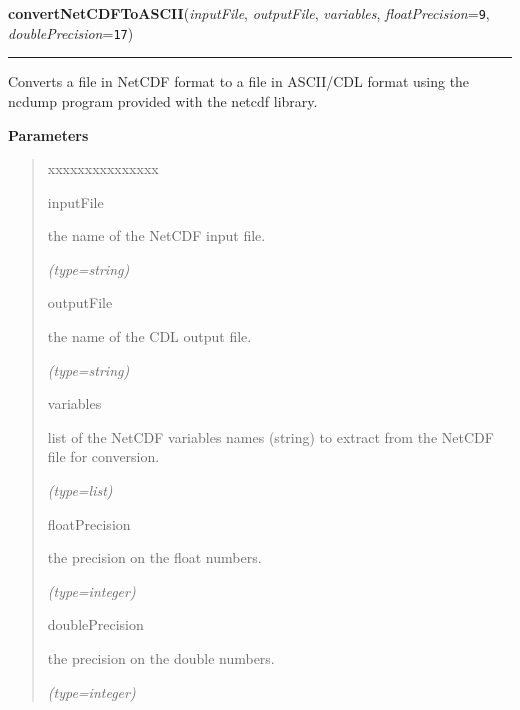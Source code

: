     \label{nMOLDYN:Core:IOFiles:convertNetCDFToASCII}

    \vspace{0.5ex}

\hspace{.8\funcindent}\begin{boxedminipage}{\funcwidth}

    \raggedright \textbf{convertNetCDFToASCII}(\textit{inputFile}, \textit{outputFile}, \textit{variables}, \textit{floatPrecision}={\tt 9}, \textit{doublePrecision}={\tt 17})

    \vspace{-1.5ex}

    \rule{\textwidth}{0.5\fboxrule}
\setlength{\parskip}{2ex}
    Converts a file in NetCDF format to a file in ASCII/CDL format using 
    the ncdump program provided with the netcdf library.

\setlength{\parskip}{1ex}
      \textbf{Parameters}
      \vspace{-1ex}

      \begin{quote}
        \begin{Ventry}{xxxxxxxxxxxxxxx}

          \item[inputFile]

          the name of the NetCDF input file.

            {\it (type=string)}

          \item[outputFile]

          the name of the CDL output file.

            {\it (type=string)}

          \item[variables]

          list of the NetCDF variables names (string) to extract from the 
          NetCDF file for conversion.

            {\it (type=list)}

          \item[floatPrecision]

          the precision on the float numbers.

            {\it (type=integer)}

          \item[doublePrecision]

          the precision on the double numbers.

            {\it (type=integer)}

        \end{Ventry}

      \end{quote}

    \end{boxedminipage}

